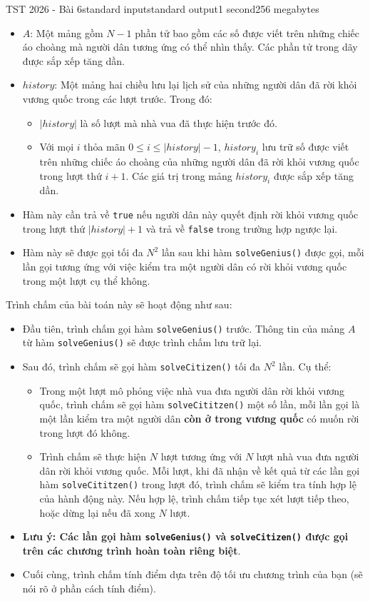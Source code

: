 \begin{problem}{TST 2026 - Bài 6}{standard input}{standard output}{1 second}{256 megabytes}
\begin{itemize}
   \item $A$: Một mảng gồm $N-1$ phần tử bao gồm các số được viết trên những chiếc áo choàng mà người dân tương ứng có thể nhìn thấy. Các phần tử trong dãy được sắp xếp tăng dần.
   \item $history$: Một mảng hai chiều lưu lại lịch sử của những người dân đã rời khỏi vương quốc trong các lượt trước. Trong đó:
   \begin{itemize}
      \item $|history|$ là số lượt mà nhà vua đã thực hiện trước đó.
      \item Với mọi $i$ thỏa mãn $0\le i\le |history|-1$, $history_i$ lưu trữ số được viết trên những chiếc áo choàng của những người dân đã rời khỏi vương quốc trong lượt thứ $i+1$. Các giá trị trong mảng $history_i$ được sắp xếp tăng dần.
   \end{itemize}
   \item Hàm này cần trả về \texttt{true} nếu người dân này quyết định rời khỏi vương quốc trong lượt thứ $|history|+1$ và trả về \texttt{false} trong trường hợp ngược lại.
   \item Hàm này sẽ được gọi tối đa $N^2$ lần sau khi hàm \texttt{solveGenius()} được gọi, mỗi lần gọi tương ứng với việc kiểm tra một người dân có rời khỏi vương quốc trong một lượt cụ thể không.
\end{itemize}

Trình chấm của bài toán này sẽ hoạt động như sau:
\begin{itemize}
   \item Đầu tiên, trình chấm gọi hàm \texttt{solveGenius()} trước. Thông tin của mảng $A$ từ hàm \texttt{solveGenius()} sẽ được trình chấm lưu trữ lại.
   \item Sau đó, trình chấm sẽ gọi hàm \texttt{solveCitizen()} tối đa $N^2$ lần. Cụ thể:
   \begin{itemize}
      \item Trong một lượt mô phỏng việc nhà vua đưa người dân rời khỏi vương quốc, trình chấm sẽ gọi hàm \texttt{solveCititzen()} một số lần, mỗi lần gọi là một lần kiểm tra một người dân \textbf{còn ở trong vương quốc} có muốn rời trong lượt đó không.
      \item Trình chấm sẽ thực hiện $N$ lượt tương ứng với $N$ lượt nhà vua đưa người dân rời khỏi vương quốc. Mỗi lượt, khi đã nhận về kết quả từ các lần gọi hàm \texttt{solveCititzen()} trong lượt đó, trình chấm sẽ kiểm tra tính hợp lệ của hành động này. Nếu hợp lệ, trình chấm tiếp tục xét lượt tiếp theo, hoặc dừng lại nếu đã xong $N$ lượt.
   \end{itemize}
   \item \textbf{Lưu ý: Các lần gọi hàm \texttt{solveGenius()} và \texttt{solveCitizen()} được gọi trên các chương trình hoàn toàn riêng biệt}.
   \item Cuối cùng, trình chấm tính điểm dựa trên độ tối ưu chương trình của bạn (sẽ nói rõ ở phần cách tính điểm).
\end{itemize}


\end{problem}
